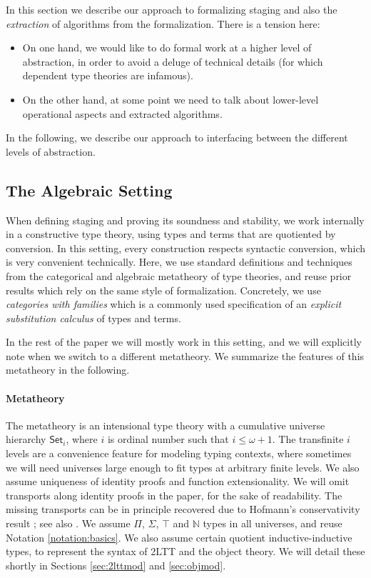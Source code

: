 \documentclass[acmsmall,screen]{acmart}
\newcommand{\mbb}[1]{\mathbb{#1}}
\newcommand{\Set}{\mathsf{Set}}
\theoremstyle{remark}
\begin{document}
In this section we describe our approach to formalizing staging and also the
\emph{extraction} of algorithms from the formalization. There is a tension
here:
\begin{itemize}
  \item On one hand, we would like to do formal work at a higher level of
    abstraction, in order to avoid a deluge of technical details (for which
    dependent type theories are infamous).
  \item On the other hand, at some point we need to talk about lower-level
    operational aspects and extracted algorithms.
\end{itemize}
In the following, we describe our approach to interfacing between the different levels
of abstraction.

\subsection{The Algebraic Setting}

When defining staging and proving its soundness and stability, we work
internally in a constructive type theory, using types and terms that are
quotiented by conversion. In this setting, every construction respects syntactic
conversion, which is very convenient technically. Here, we use standard
definitions and techniques from the categorical and algebraic metatheory of type
theories, and reuse prior results which rely on the same style of
formalization. Concretely, we use \emph{categories with families} \cite{cwfs}
which is a commonly used specification of an \emph{explicit substitution
calculus} of types and terms.

In the rest of the paper we will mostly work in this setting, and we will
explicitly note when we switch to a different metatheory. We summarize
the features of this metatheory in the following.

\paragraph{Metatheory}
The metatheory is an intensional type theory with a cumulative universe
hierarchy $\Set_i$, where $i$ is ordinal number such that $i \leq \omega +
1$. The transfinite $i$ levels are a convenience feature for modeling typing
contexts, where sometimes we will need universes large enough to fit types at
arbitrary finite levels. We also assume uniqueness of identity proofs and
function extensionality. We will omit transports along identity proofs in the
paper, for the sake of readability. The missing transports can be in principle
recovered due to Hofmann's conservativity result \cite{hofmann95extensional};
see also \cite{DBLP:conf/cpp/WinterhalterST19}. We assume $\Pi$, $\Sigma$,
$\top$ and $\mbb{N}$ types in all universes, and reuse Notation
\ref{notation:basics}. We also assume certain quotient inductive-inductive
types, to represent the syntax of 2LTT and the object theory. We will detail
these shortly in Sections \ref{sec:2lttmod} and \ref{sec:objmod}.
\end{document}
